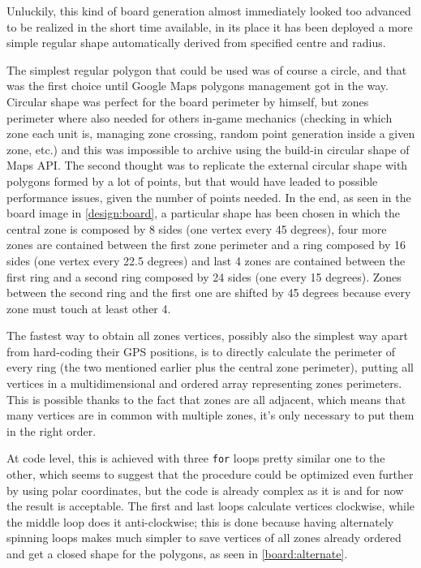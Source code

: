 			Unluckily, this kind of board generation almost immediately looked too advanced to be realized in the short time available, in its place it has been deployed a more simple regular shape automatically derived from specified centre and radius.
			
			The simplest regular polygon that could be used was of course a circle, and that was the first choice until Google Maps polygons management got in the way. Circular shape was perfect for the board perimeter by himself, but zones perimeter where also needed for others in-game mechanics (checking in which zone each unit is, managing zone crossing, random point generation inside a given zone, etc.) and this was impossible to archive using the build-in circular shape of Maps API.
			The second thought was to replicate the external circular shape with polygons formed by a lot of points, but that would have leaded to possible performance issues, given the number of points needed.
			In the end, as seen in the board image in \autoref{design:board}, a particular shape has been chosen in which the central zone is composed by 8 sides (one vertex every 45 degrees), four more zones are contained between the first zone perimeter and a ring composed by 16 sides (one vertex every 22.5 degrees) and last 4 zones are contained between the first ring and a second ring composed by 24 sides (one every 15 degrees).
			Zones between the second ring and the first one are shifted by 45 degrees because every zone must touch at least other 4.
			
			The fastest way to obtain all zones vertices, possibly also the simplest way apart from hard-coding their GPS positions, is to directly calculate the perimeter of every ring (the two mentioned earlier plus the central zone perimeter), putting all vertices in a multidimensional and ordered array representing zones perimeters.
			This is possible thanks to the fact that zones are all adjacent, which means that many vertices are in common with multiple zones, it's only necessary to put them in the right order.
			
			At code level, this is achieved with three \lstinline|for| loops pretty similar one to the other, which seems to suggest that the procedure could be optimized even further by using polar coordinates, but the code is already complex as it is and for now the result is acceptable.
			The first and last loops calculate vertices clockwise, while the middle loop does it anti-clockwise; this is done because having alternately spinning loops makes much simpler to save vertices of all zones already ordered and get a closed shape for the polygons, as seen in \autoref{board:alternate}.
			
